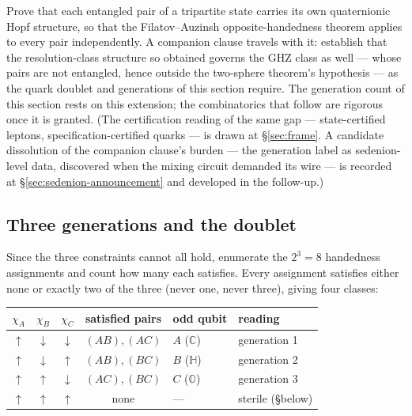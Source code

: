 \begin{openproblem}\label{op:filatov-extension}
Prove that each entangled pair of a tripartite state carries its own quaternionic Hopf structure,
so that the Filatov--Auzinsh opposite-handedness theorem \autocite{filatov2024towards} applies to
every pair independently. A companion clause travels with it: establish that the resolution-class
structure so obtained governs the GHZ class as well --- whose pairs are not entangled, hence outside
the two-sphere theorem's hypothesis --- as the quark doublet and generations of this section
require. The generation count of this section rests on this extension; the combinatorics that
follow are rigorous once it is granted. (The certification reading of the same gap ---
state-certified leptons, specification-certified quarks --- is drawn at \S\ref{sec:frame}. A
candidate dissolution of the companion clause's burden --- the generation label as sedenion-level
data, discovered when the mixing circuit demanded its wire --- is recorded at
\S\ref{sec:sedenion-announcement} and developed in the follow-up.)
\end{openproblem}

\subsection{Three generations and the doublet}

Since the three constraints cannot all hold, enumerate the $2^3 = 8$ handedness assignments and count
how many each satisfies. Every assignment satisfies either none or exactly two of the three (never
one, never three), giving four classes:

\begin{center}
\begin{tabular}{ccccll}
\hline
$\chi_A$ & $\chi_B$ & $\chi_C$ & satisfied pairs & odd qubit & reading \\
\hline
$\uparrow$ & $\downarrow$ & $\downarrow$ & $(AB),(AC)$ & $A$ ($\mathbb{C}$)  & generation 1 \\
$\uparrow$ & $\downarrow$ & $\uparrow$   & $(AB),(BC)$ & $B$ ($\mathbb{H}$)  & generation 2 \\
$\uparrow$ & $\uparrow$   & $\downarrow$ & $(AC),(BC)$ & $C$ ($\mathbb{O}$)  & generation 3 \\
$\uparrow$ & $\uparrow$   & $\uparrow$   & none        & ---                 & sterile (\S below) \\
\hline
\end{tabular}
\end{center}

